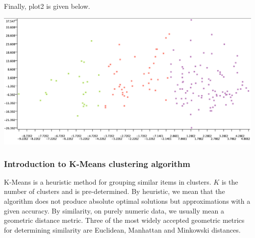 \documentclass[11pt]{article}
\begin{document}
			\fi
			Finally, plot2 is given below.
			\iftrue
			\begin{center}
				\includegraphics[scale=0.5]{res/t1/t12/t12-plot2}
			\end{center}
			\fi
			\subsubsection*{Introduction to K-Means clustering algorithm}
				K-Means is a heuristic method for grouping {similar} items in clusters. $K$ is the number of clusters and is pre-determined. By heuristic, we mean that the algorithm does not produce absolute optimal solutions but approximations with a given accuracy. By similarity, on purely numeric data, we usually mean a geometric distance metric. Three of the most widely accepted geometric metrics for determining similarity are Euclidean, Manhattan and Minkowski distances.
\end{document}
